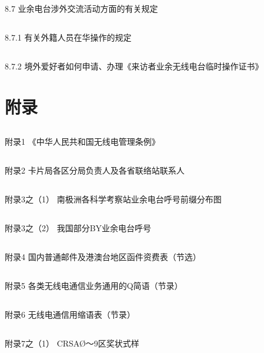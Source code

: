 \documentclass[12pt,UTF8]{ctexbook}
\begin{document}
\section{}8.7 业余电台涉外交流活动方面的有关规定
\section{}8.7.1 有关外籍人员在华操作的规定
\section{}8.7.2 境外爱好者如何申请、办理《来访者业余无线电台临时操作证书》

\backmatter

\chapter{附录}

\section{}附录1 《中华人民共和国无线电管理条例》
\section{}附录2 卡片局各区分局负责人及各省联络站联系人
\section{}附录3之（1） 南极洲各科学考察站业余电台呼号前缀分布图
\section{}附录3之（2） 我国部分BY业余电台呼号
\section{}附录4 国内普通邮件及港澳台地区函件资费表（节选）
\section{}附录5 各类无线电通信业务通用的Q简语（节录）
\section{}附录6 无线电通信用缩语表（节录）
\section{}附录7之（1） CRSAØ～9区奖状式样
\end{document}
